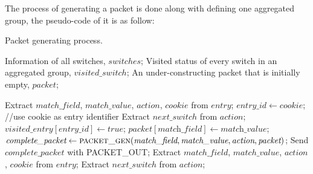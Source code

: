 The process of generating a packet is done along with defining one aggregated group, the pseudo-code of it is as follow:

\begin {tcolorbox}[blanker,float=tbp,
grow to left by=1cm, grow to right by=1cm]
\begin{algorithm}[H]

  \caption{Packet generating process.}
  \begin{algorithmic}[1]
    \Require
      Information of all switches, $switches$;
      Visited status of every switch in an aggregated group, $visited\_switch$;
      An under-constructing packet that is initially empty, $packet$; 

          \State Extract $match\_field$, $match\_value$, $action$, $cookie$ from $entry$;
          \State $entry\_id \gets \textit{cookie}$; //use cookie as entry identifier
          \State 
          \State Extract $next\_switch$ from $action$;
            \State $\textit{visited\_entry}[\textit{entry\_id}] \gets true$;
            \State $packet[\textit{match\_field}] \gets \textit{match\_value}$;
            \State $\textit{complete\_packet} \gets \Call{packet\_gen}{\textit{match\_field}, \textit{match\_value}, \textit{action}, \textit{packet}}$;
            \State Send $\textit{complete\_packet}$ with PACKET\_OUT;
          \EndIf
      \EndFor
        \EndFor
    \EndFunction
    \State
        \State Extract $match\_field$, $match\_value$, $action$, $cookie$ from $entry$;
        \State Extract $next\_switch$ from $action$; 
  \end{algorithmic}
\end{algorithm}
\end{tcolorbox}


